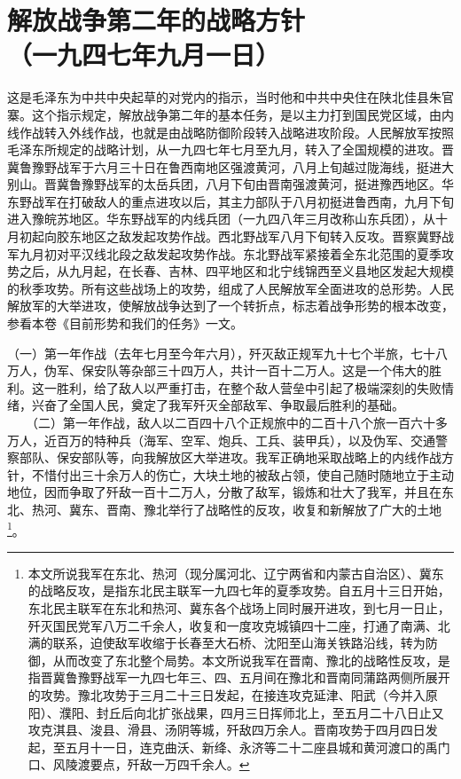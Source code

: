 \documentclass[cn,11pt,chinese]{elegantbook}
\def\myformat#1{\hfil\hfil #1}
\begin{document}
\newpage\section*{\myformat{解放战争第二年的战略方针}\\\myformat{（一九四七年九月一日）}}
\begin{introduction}\item  这是毛泽东为中共中央起草的对党内的指示，当时他和中共中央住在陕北佳县朱官寨。这个指示规定，解放战争第二年的基本任务，是以主力打到国民党区域，由内线作战转入外线作战，也就是由战略防御阶段转入战略进攻阶段。人民解放军按照毛泽东所规定的战略计划，从一九四七年七月至九月，转入了全国规模的进攻。晋冀鲁豫野战军于六月三十日在鲁西南地区强渡黄河，八月上旬越过陇海线，挺进大别山。晋冀鲁豫野战军的太岳兵团，八月下旬由晋南强渡黄河，挺进豫西地区。华东野战军在打破敌人的重点进攻以后，其主力部队于八月初挺进鲁西南，九月下旬进入豫皖苏地区。华东野战军的内线兵团（一九四八年三月改称山东兵团），从十月初起向胶东地区之敌发起攻势作战。西北野战军八月下旬转入反攻。晋察冀野战军九月初对平汉线北段之敌发起攻势作战。东北野战军紧接着全东北范围的夏季攻势之后，从九月起，在长春、吉林、四平地区和北宁线锦西至义县地区发起大规模的秋季攻势。所有这些战场上的攻势，组成了人民解放军全面进攻的总形势。人民解放军的大举进攻，使解放战争达到了一个转折点，标志着战争形势的根本改变，参看本卷《目前形势和我们的任务》一文。\end{introduction}
（一）第一年作战（去年七月至今年六月），歼灭敌正规军九十七个半旅，七十八万人，伪军、保安队等杂部三十四万人，共计一百十二万人。这是一个伟大的胜利。这一胜利，给了敌人以严重打击，在整个敌人营垒中引起了极端深刻的失败情绪，兴奋了全国人民，奠定了我军歼灭全部敌军、争取最后胜利的基础。\\
　　（二）第一年作战，敌人以二百四十八个正规旅中的二百十八个旅一百六十多万人，近百万的特种兵（海军、空军、炮兵、工兵、装甲兵），以及伪军、交通警察部队、保安部队等，向我解放区大举进攻。我军正确地采取战略上的内线作战方针，不惜付出三十余万人的伤亡，大块土地的被敌占领，使自己随时随地立于主动地位，因而争取了歼敌一百十二万人，分散了敌军，锻炼和壮大了我军，并且在东北、热河、冀东、晋南、豫北举行了战略性的反攻，收复和新解放了广大的土地\footnote[1]{ 本文所说我军在东北、热河（现分属河北、辽宁两省和内蒙古自治区）、冀东的战略反攻，是指东北民主联军一九四七年的夏季攻势。自五月十三日开始，东北民主联军在东北和热河、冀东各个战场上同时展开进攻，到七月一日止，歼灭国民党军八万二千余人，收复和一度攻克城镇四十二座，打通了南满、北满的联系，迫使敌军收缩于长春至大石桥、沈阳至山海关铁路沿线，转为防御，从而改变了东北整个局势。本文所说我军在晋南、豫北的战略性反攻，是指晋冀鲁豫野战军一九四七年三、四、五月间在豫北和晋南同蒲路两侧所展开的攻势。豫北攻势于三月二十三日发起，在接连攻克延津、阳武（今并入原阳）、濮阳、封丘后向北扩张战果，四月三日挥师北上，至五月二十八日止又攻克淇县、浚县、滑县、汤阴等城，歼敌四万余人。晋南攻势于四月四日发起，至五月十一日，连克曲沃、新绛、永济等二十二座县城和黄河渡口的禹门口、风陵渡要点，歼敌一万四千余人。}。\\
\end{document}
